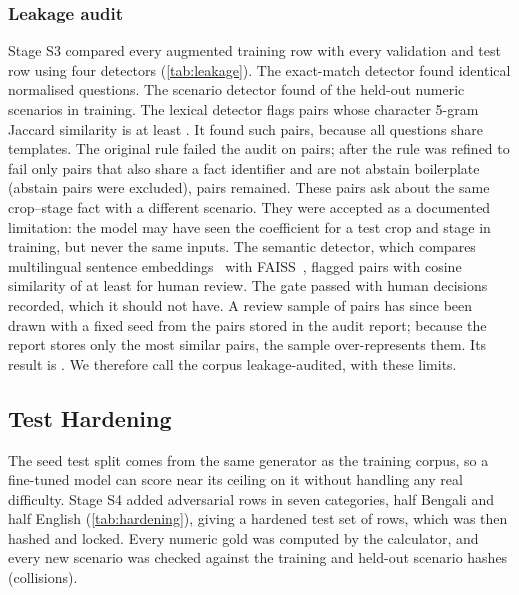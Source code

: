 \subsubsection*{Leakage audit}
Stage S3 compared every augmented training row with every validation and test row using four detectors (\cref{tab:leakage}). The exact-match detector found \LeakExactCount identical normalised questions. The scenario detector found \LeakScenarioOverlap of the \LeakScenarioHeldout held-out numeric scenarios in training. The lexical detector flags pairs whose character 5-gram Jaccard similarity is at least \LeakJaccardThreshold. It found \LeakJaccardPairs such pairs, because all questions share templates. The original rule failed the audit on \LeakJaccardHitsOriginal pairs; after the rule was refined to fail only pairs that also share a fact identifier and are not abstain boilerplate (\LeakJaccardAbstainExcluded abstain pairs were excluded), \LeakJaccardHitsRefined pairs remained. These pairs ask about the same crop--stage fact with a different scenario. They were accepted as a documented limitation: the model may have seen the coefficient for a test crop and stage in training, but never the same inputs. The semantic detector, which compares multilingual sentence embeddings~\cite{reimers2020making} with FAISS~\cite{johnson2021billion}, flagged \LeakSemCandidates pairs with cosine similarity of at least \LeakSemThreshold for human review. The gate passed with \LeakSemDecisionsRecorded human decisions recorded, which it should not have. A review sample of \LeakReviewSample pairs has since been drawn with a fixed seed from the \LeakReviewFrame pairs stored in the audit report; because the report stores only the most similar pairs, the sample over-represents them. Its result is . We therefore call the corpus leakage-audited, with these limits.

\subsection{Test Hardening}
\label{sec:hardening}

The seed test split comes from the same generator as the training corpus, so a fine-tuned model can score near its ceiling on it without handling any real difficulty. Stage S4 added \TestRowsAdv adversarial rows in seven categories, half Bengali and half English (\cref{tab:hardening}), giving a hardened test set of \TestRows rows, which was then hashed and locked. Every numeric gold was computed by the calculator, and every new scenario was checked against the training and held-out scenario hashes (\AdvScenarioCollisions collisions).

